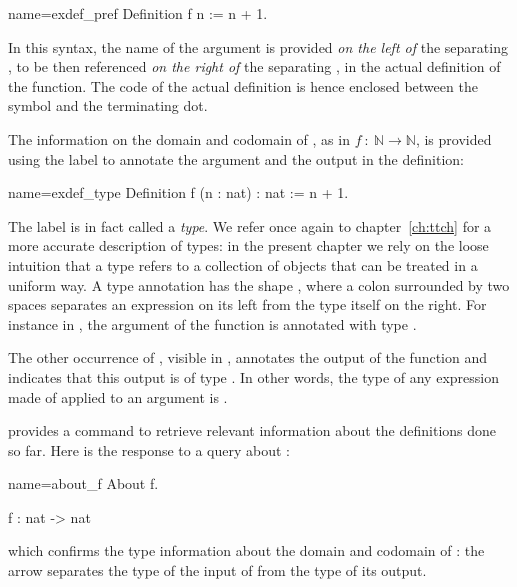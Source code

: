 \begin{coq}{name=exdef_pref}{}
Definition f n := n + 1.
\end{coq}

In this syntax, the name of the argument  is provided
\emph{on the left of} the separating \C{:=}, to be then referenced
\emph{on the right of} the separating \C{:=}, in the actual
definition of the function. The code of the actual definition is
hence enclosed between the \C{:=} symbol and the terminating dot.

The information on the domain and codomain of ,
as in \(f\ :\ {\mathbb{N}}\rightarrow{\mathbb{N}}\), is provided using
the  label to annotate the argument and the output in the
\Coq{} definition:

\begin{coq}{name=exdef_type}{}
Definition f (n : nat) : nat := n + 1.
\end{coq}
The label  is in fact called a {\em type}.
We refer once again to chapter~\ref{ch:ttch} for a more accurate
description of types: in the present chapter we rely on the loose intuition
that a type refers to a collection of objects that can be treated in a
uniform way. A type annotation has the shape , where a colon
\C{:} surrounded by two spaces separates an expression  on its
left from the type  itself on the right. For instance in
, the argument  of the function  is annotated with
type .

The other occurrence  of , visible in ,
annotates the output of the function and indicates that this output is
of type . In other words, the type of any expression made of
 applied to an argument is .

\Coq{} provides a command to retrieve relevant information about the
definitions done so far. Here is the response to a query about :


\begin{coq-left}{name=about_f}{}
About f.
\end{coq-left}
\begin{coqout-right}%
f : nat -> nat
\end{coqout-right}
which confirms the type information about the domain and codomain of
: the arrow \C{->} separates the type of the input of  from
the type of its output.

